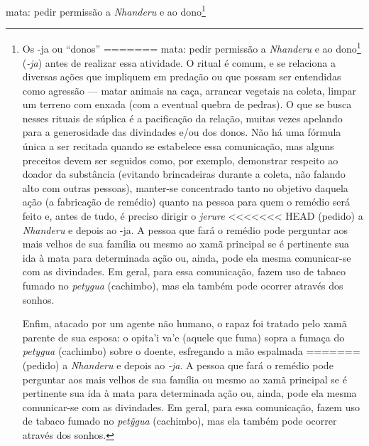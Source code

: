 mata: pedir permissão a \emph{Nhanderu} e ao dono\footnote{Os -ja ou ``donos''
=======
mata: pedir permissão a \emph{Nhanderu} e ao dono\footnote{Os \emph{-ja} ou ``donos''
>>>>>>> aa250de89a40bf54eebc8ed9e93a5c93bf66741b
são seres criados pelas divindades celestes para atuarem como
cuidadores de seres não humanos, geralmente residentes em seus \emph{tekoa} na
mata, como as queixadas, por exemplo --- neste caso, trata-se do \emph{koxija},
``dono das queixadas''. Eles podem, eventualmente, tomar a forma humana
ou daqueles pelos quais zelam. Para explicar como atua essa figura, um
xamã comparou-a ao capataz de gado em uma fazenda, diligente com o
gado, é protetor, mas não proprietário.} (\emph{-ja}) antes de realizar essa
atividade. O ritual é comum, e se relaciona a diversas ações que
impliquem em predação ou que possam ser entendidas como agressão ---
matar animais na caça, arrancar vegetais na coleta, limpar um terreno
com enxada (com a eventual quebra de pedras). O que se busca nesses
rituais de súplica é a pacificação da relação, muitas vezes apelando
para a generosidade das divindades e/ou dos donos. Não há uma fórmula
única a ser recitada quando se estabelece essa comunicação, mas alguns
preceitos devem ser seguidos como, por exemplo, demonstrar respeito ao
doador da substância (evitando brincadeiras durante a coleta, não
falando alto com outras pessoas), manter-se concentrado tanto no
objetivo daquela ação (a fabricação de remédio) quanto na pessoa para
quem o remédio será feito e, antes de tudo, é preciso dirigir o \emph{jerure}
<<<<<<< HEAD
(pedido) a \emph{Nhanderu} e depois ao -ja. A pessoa que fará o remédio pode
perguntar aos mais velhos de sua família ou mesmo ao xamã principal se
é pertinente sua ida à mata para determinada ação ou, ainda, pode ela
mesma comunicar-se com as divindades. Em geral, para essa comunicação,
fazem uso de tabaco fumado no \emph{petygua} (cachimbo), mas ela também
pode ocorrer através dos sonhos. 

Enfim, atacado por um agente não humano, o rapaz foi tratado pelo xamã
parente de sua esposa: o opita’i va’e (aquele que fuma) sopra a fumaça
do \emph{petygua} (cachimbo) sobre o doente, esfregando a mão espalmada
=======
(pedido) a \emph{Nhanderu} e depois ao \emph{-ja}. A pessoa que fará o remédio pode
perguntar aos mais velhos de sua família ou mesmo ao xamã principal se
é pertinente sua ida à mata para determinada ação ou, ainda, pode ela
mesma comunicar-se com as divindades. Em geral, para essa comunicação,
fazem uso de tabaco fumado no \emph{pet\~{y}gua} (cachimbo), mas ela também
pode ocorrer através dos sonhos. 

}
